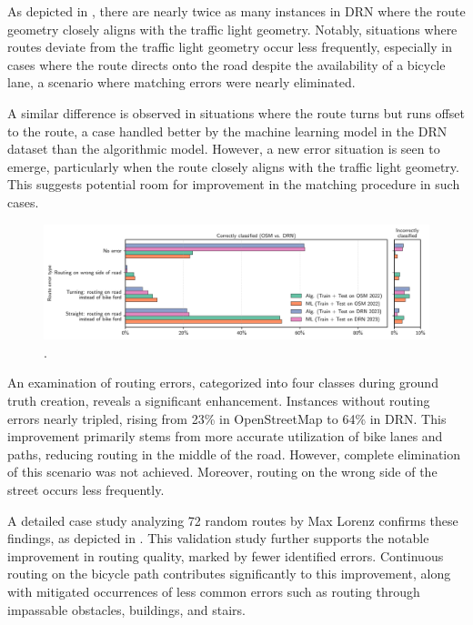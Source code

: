As depicted in , there are nearly twice as many instances in DRN where the route geometry closely aligns with the traffic light geometry. Notably, situations where routes deviate from the traffic light geometry occur less frequently, especially in cases where the route directs onto the road despite the availability of a bicycle lane, a scenario where matching errors were nearly eliminated. 

A similar difference is observed in situations where the route turns but runs offset to the route, a case handled better by the machine learning model in the DRN dataset than the algorithmic model. However, a new error situation is seen to emerge, particularly when the route closely aligns with the traffic light geometry. This suggests potential room for improvement in the matching procedure in such cases.

\begin{figure}[t]
\centering 
\includegraphics[width=\linewidth]{images/matching-route-errors-osm-vs-drn.pdf}
\caption{.}
\label{fig:}
\end{figure}

An examination of routing errors, categorized into four classes during ground truth creation, reveals a significant enhancement. Instances without routing errors nearly tripled, rising from 23\% in OpenStreetMap to 64\% in DRN. This improvement primarily stems from more accurate utilization of bike lanes and paths, reducing routing in the middle of the road. However, complete elimination of this scenario was not achieved. Moreover, routing on the wrong side of the street occurs less frequently.

A detailed case study analyzing 72 random routes by Max Lorenz confirms these findings, as depicted in . This validation study further supports the notable improvement in routing quality, marked by fewer identified errors. Continuous routing on the bicycle path contributes significantly to this improvement, along with mitigated occurrences of less common errors such as routing through impassable obstacles, buildings, and stairs.

